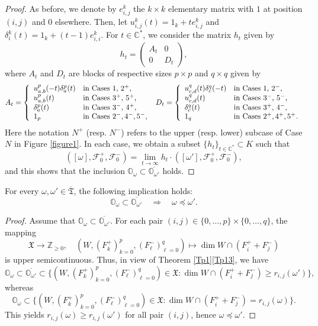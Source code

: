 \documentclass[ALCO,Unicode]{cedram}
\newcommand{\flag}{\mathcal{F}}
\newcommand{\Xorbit}{\mathbb{O}}
\newcommand{\ppermutationsof}{\mathfrak{T}}
\newcommand{\parameters}{\overline{\ppermutationsof}}
\newcommand{\Xfv}{\mathfrak{X}}
\newcommand{\mC}{\mathbb{C}}
\begin{document}
\begin{proof}
As before, we denote by $e_{i,j}^k$ the $k\times k$ elementary matrix
with $1$ at position $(i,j)$ and $0$ elsewhere.
Then, let $u_{i,j}^k(t)=1_k+te_{i,j}^k$ and $\delta_i^k(t)=1_k+(t-1)e_{i,i}^k$.
For $t\in\mC^*$, we consider the matrix $h_t$ given by
\[h_t=\begin{pmatrix} A_t & 0\\ 0 & D_t \end{pmatrix},\]
where $A_t$ and $D_t$ are blocks of respective sizes $p\times p$ and $q\times q$ given by
\[
A_t=\left\{
\begin{array}{ll}
u_{a,b}^p(-t)\delta^p_a(t) & \mbox{in Cases 1, $2^+$,}\\
u_{a,b}^p(t) & \mbox{in Cases $3^+$, $5^+$,}\\
\delta_a^p(t) & \mbox{in Cases $3^-$, $4^+$,}\\
1_p & \mbox{in Cases $2^-$,\,$4^-$,\,$5^-$,}
\end{array}
\right.
\
D_t=\left\{
\begin{array}{ll}
u^q_{c,d}(t)\delta^q_c(-t) & \mbox{in Cases 1, $2^-$,}\\
u_{c,d}^q(t) & \mbox{in Cases $3^-$, $5^-$,}\\
\delta_c^q(t) & \mbox{in Cases $3^+$, $4^-$,}\\
1_q & \mbox{in Cases $2^+$,\,$4^+$,\,$5^+$.}
\end{array}
\right.
\]
Here the notation $N^+$ (resp. $N^-$) refers to the upper (resp. lower) subcase of Case $N$ in Figure \ref{figure1}.
In each case, we obtain a subset $\{h_t\}_{t\in\mC^*}\subset K$ such that
\[([\omega],\flag_0^+,\flag_0^-)=\lim_{t\to \infty}h_t\cdot([\omega'],\flag_0^+,\flag_0^-),\]
and this shows that the inclusion $\Xorbit_\omega\subset\overline{\Xorbit_{\omega'}}$ holds.
\end{proof}

\begin{lemma}
\label{L3.5}
For every $\omega,\omega'\in\parameters$, the following implication holds:
\[\Xorbit_\omega\subset\overline{\Xorbit_{\omega'}}\quad\Longrightarrow\quad \omega\preceq\omega'.\]
\end{lemma}

\begin{proof}
Assume that $\Xorbit_\omega\subset\overline{\Xorbit_{\omega'}}$. For each pair $(i,j)\in\{0,\ldots,p\}\times\{0,\ldots,q\}$, the mapping
\[
\Xfv\to\mathbb{Z}_{\geq 0},\quad (W,(F^+_k)_{k=0}^p,(F^-_\ell)_{\ell=0}^q)\mapsto \dim W\cap(F_i^++F_j^-)
\]
is upper semicontinuous. Thus, in view of Theorem \ref{Tp1}\ref{Tp13}, we have
\[
\Xorbit_\omega\subset \overline{\Xorbit_{\omega'}}\subset\{(W,(F^+_k)_{k=0}^p,(F^-_\ell)_{\ell=0}^q)\in\Xfv:\dim W\cap (F_i^++F_j^-)\geq r_{i,j}(\omega')\},
\]
whereas
\[
\Xorbit_\omega\subset\{(W,(F^+_k)_{k=0}^p,(F^-_\ell)_{\ell=0}^q)\in\Xfv:\dim W\cap (F_i^++F_j^-)=r_{i,j}(\omega)\}.
\]
This yields $r_{i,j}(\omega)\geq r_{i,j}(\omega')$ for all pair $(i,j)$, hence $\omega\preceq\omega'$.
\end{proof}
\end{document}
